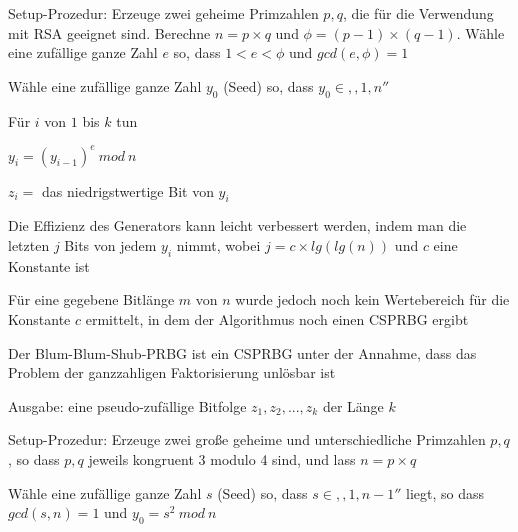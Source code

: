 \documentclass[a4paper]{article}
\begin{document}
\begin{multicols}{3}
\begin{itemize*}
\begin{itemize*}
            \end{itemize*}
            \begin{enumerate*}
                  \item Setup-Prozedur: Erzeuge zwei geheime Primzahlen $p, q$, die für die Verwendung mit RSA geeignet sind. Berechne $n=p\times q$ und $\phi=(p-1)\times(q-1)$. Wähle eine zufällige ganze Zahl $e$ so, dass $1< e<\phi$ und $gcd(e,\phi)=1$
                  \item Wähle eine zufällige ganze Zahl $y_0$ (Seed) so, dass $y_0\in ,,1,n''$
                  \item Für $i$ von $1$ bis $k$ tun
                  \begin{enumerate*}
                        \item $y_i=(y_{i-1})^e\ mod\ n$
                        \item $z_i =$ das niedrigstwertige Bit von $y_i$
                  \end{enumerate*}
            \end{enumerate*}
            \begin{itemize*}
                  \item Die Effizienz des Generators kann leicht verbessert werden, indem man die letzten $j$ Bits von jedem $y_i$ nimmt, wobei $j=c\times lg(lg(n))$ und $c$ eine Konstante ist
                  \item Für eine gegebene Bitlänge $m$ von $n$ wurde jedoch noch kein Wertebereich für die Konstante $c$ ermittelt, in dem der Algorithmus noch einen CSPRBG ergibt
            \end{itemize*}
            \item Der Blum-Blum-Shub-PRBG ist ein CSPRBG unter der Annahme, dass das Problem der ganzzahligen Faktorisierung unlösbar ist
            \begin{itemize*}
                  \item Ausgabe: eine pseudo-zufällige Bitfolge $z_1,z_2,...,z_k$ der Länge $k$
            \end{itemize*}
            \begin{enumerate*}
                  \item Setup-Prozedur: Erzeuge zwei große geheime und unterschiedliche Primzahlen $p,q$, so dass $p,q$ jeweils kongruent 3 modulo 4 sind, und lass $n=p\times q$
                  \item Wähle eine zufällige ganze Zahl $s$ (Seed) so, dass $s\in ,,1, n-1''$ liegt, so dass $gcd(s,n)=1$ und $y_0=s^2\ mod\ n$

\end{enumerate*}
\end{itemize*}
\end{multicols}
\end{document}
